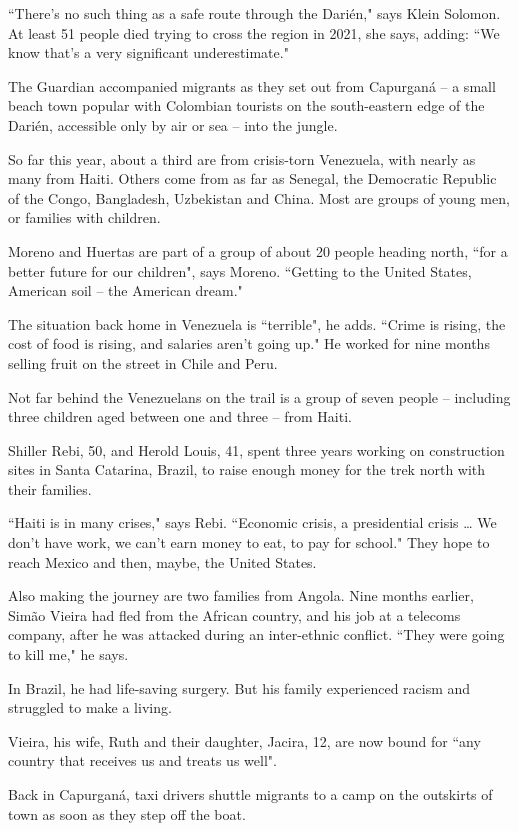 \documentclass[10pt,a4paper]{article}
\newcommand{\qm}[1]{``#1"}
\begin{document}
\qm{There's no such thing as a safe route through the Darién,} says Klein Solomon. At least 51 people died trying to cross the region in 2021, she says, adding: \qm{We know that's a very significant underestimate.}

The Guardian accompanied migrants as they set out from Capurganá -- a small beach town popular with Colombian tourists on the south-eastern edge of the Darién, accessible only by air or sea -- into the jungle.

So far this year, about a third are from crisis-torn Venezuela, with nearly as many from Haiti. Others come from as far as Senegal, the Democratic Republic of the Congo, Bangladesh, Uzbekistan and China. Most are groups of young men, or families with children.

Moreno and Huertas are part of a group of about 20 people heading north, \qm{for a better future for our children}, says Moreno. \qm{Getting to the United States, American soil -- the American dream.}

The situation back home in Venezuela is \qm{terrible}, he adds. \qm{Crime is rising, the cost of food is rising, and salaries aren't going up.} He worked for nine months selling fruit on the street in Chile and Peru.

Not far behind the Venezuelans on the trail is a group of seven people -- including three children aged between one and three -- from Haiti.

Shiller Rebi, 50, and Herold Louis, 41, spent three years working on construction sites in Santa Catarina, Brazil, to raise enough money for the trek north with their families.

\qm{Haiti is in many crises,} says Rebi. \qm{Economic crisis, a presidential crisis \ldots{} We don't have work, we can't earn money to eat, to pay for school.} They hope to reach Mexico and then, maybe, the United States.

Also making the journey are two families from Angola. Nine months earlier, Simão Vieira had fled from the African country, and his job at a telecoms company, after he was attacked during an inter-ethnic conflict. \qm{They were going to kill me,} he says.

In Brazil, he had life-saving surgery. But his family experienced racism and struggled to make a living.

Vieira, his wife, Ruth and their daughter, Jacira, 12, are now bound for \qm{any country that receives us and treats us well}.

Back in Capurganá, taxi drivers shuttle migrants to a camp on the outskirts of town as soon as they step off the boat.
\end{document}
